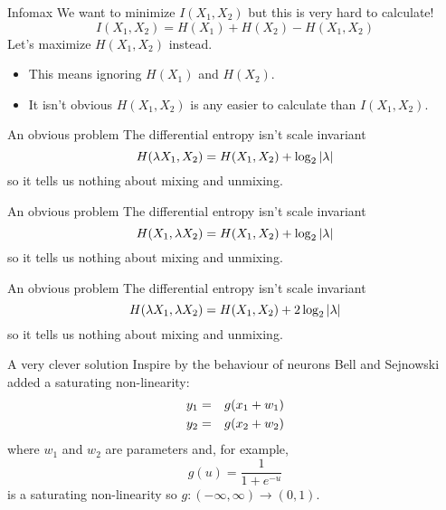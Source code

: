 \documentclass{beamer}
\newcommand{\crish}{\color{reddish}}
\newcommand{\cbla}{\color{black}}
\newcommand{\cblu}{\color{blue}}
\begin{document}
\begin{frame}{Infomax}
  We want to minimize $I(X_1,X_2)$\cbla{} but this is very hard to calculate!
  \crish
  $$
  I(X_1,X_2)=H(X_1)+H(X_2)-H(X_1,X_2)
  $$
  \cbla
  Let's maximize \crish$H(X_1,X_2)$\cbla{} instead.
  \begin{itemize}
  \item This means ignoring \crish$H(X_1)$\cbla{} and \crish$H(X_2)$\cbla{}.
  \item It isn't obvious \crish$H(X_1,X_2)$\cbla{} is any easier to calculate than \crish$I(X_1,X_2)$\cbla{}.
  \end{itemize}
\end{frame}

\begin{frame}{An obvious problem}
  The differential entropy isn't scale invariant
  \crish
  $$
  H(\cblu{}\lambda\crish{}{}X_1,X_2)=H(X_1,X_2)+\log_2{|\cblu{}\lambda\crish{}|}
  $$
  \cbla
  so it tells us nothing about mixing and unmixing.
  \end{frame}


\begin{frame}{An obvious problem}
  The differential entropy isn't scale invariant
  \crish
  $$
  H(X_1,\cblu{}\lambda\crish{}{}X_2)=H(X_1,X_2)+\log_2{|\cblu{}\lambda\crish{}|}
  $$
  \cbla
    so it tells us nothing about mixing and unmixing.
  \end{frame}

\begin{frame}{An obvious problem}
  The differential entropy isn't scale invariant
  \crish
  $$
  H(\cblu{}\lambda\crish{}{}X_1,\cblu{}\lambda\crish{}{}X_2)=H(X_1,X_2)+2\log_2{|\cblu{}\lambda\crish{}|}
  $$
  \cbla
    so it tells us nothing about mixing and unmixing.
\end{frame}

\begin{frame}{A very clever solution}
  Inspire by the behaviour of neurons Bell and Sejnowski added a saturating non-linearity:
  \crish
  \begin{eqnarray*}
y_1&=&g(x_1+w_1)\cr
y_2&=&g(x_2+w_2)
\end{eqnarray*}
  \cbla
  where  \crish$w_1$\cbla{} and \crish$w_2$\cbla{} are parameters and, for example,
\crish $$
g(u)=\frac{1}{1+e^{-u}}
$$ \cbla{}
is a saturating non-linearity so \crish$g:(-\infty,\infty)\rightarrow (0,1)$.\cbla{}
  \vfill
\end{frame}
\end{document}
